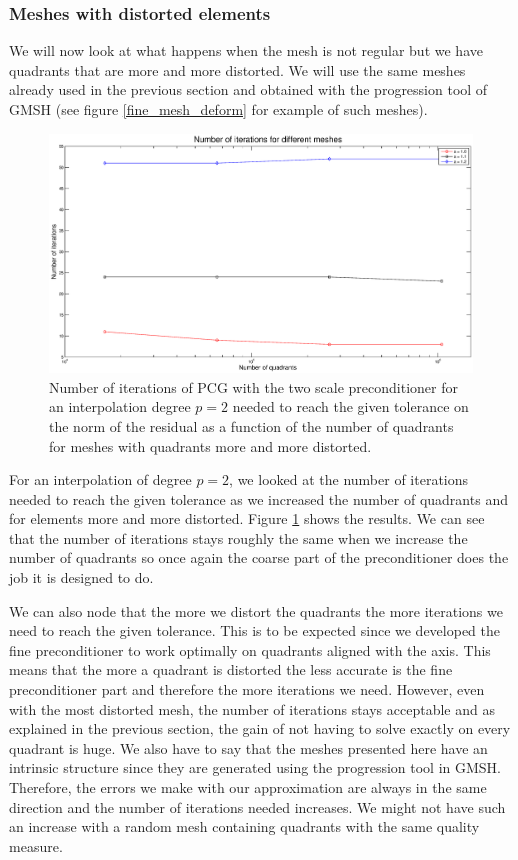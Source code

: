 \subsubsection{Meshes with distorted elements}

We will now look at what happens when the mesh is not regular but we have quadrants that are more and more distorted. We will use the same meshes already used in the previous section and obtained with the progression tool of GMSH (see figure \ref{fine_mesh_deform} for example of such meshes).

\begin{figure}
\centering
\includegraphics[scale=0.35]{Results/two_irreg_iter.eps}
\caption{Number of iterations of PCG with the two scale preconditioner for an interpolation degree $p=2$ needed to reach the given tolerance on the norm of the residual as a function of the number of quadrants for meshes with quadrants more and more distorted.}
\label{two_irreg_iter}
\end{figure}

For an interpolation of degree $p=2$, we looked at the number of iterations needed to reach the given tolerance as we increased the number of quadrants and for elements more and more distorted. Figure \ref{two_irreg_iter} shows the results. We can see that the number of iterations stays roughly the same when we increase the number of quadrants so once again the coarse part of the preconditioner does the job it is designed to do. 

We can also node that the more we distort the quadrants the more iterations we need to reach the given tolerance. This is to be expected since we developed the fine preconditioner to work optimally on quadrants aligned with the axis. This means that the more a quadrant is distorted the less accurate is the fine preconditioner part and therefore the more iterations we need. However, even with the most distorted mesh, the number of iterations stays acceptable and as explained in the previous section, the gain of not having to solve exactly on every quadrant is huge. We also have to say that the meshes presented here have an intrinsic structure since they are generated using the progression tool in GMSH. Therefore, the errors we make with our approximation are always in the same direction and the number of iterations needed increases. We might not have such an increase with a random mesh containing quadrants with the same quality measure. 


